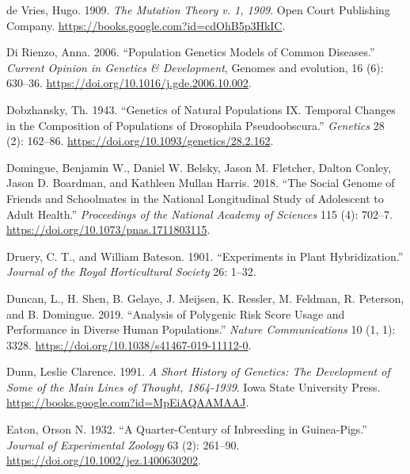 \documentclass[
]{book}
\newlength{\cslhangindent}
\newlength{\cslentryspacingunit} %
\newenvironment{CSLReferences}[2] %
 {%
  \setlength{\parindent}{0pt}
  \ifodd #1
  \let\oldpar\par
  \def\par{\hangindent=\cslhangindent\oldpar}
  \fi
  \setlength{\parskip}{#2\cslentryspacingunit}
 }%
 {}
\begin{document}
\begin{CSLReferences}{1}{0}
\leavevmode{}%
de Vries, Hugo. 1909. \emph{The {Mutation} Theory v. 1, 1909}. {Open Court Publishing Company}. \url{https://books.google.com?id=cdOhB5p3HkIC}.

\leavevmode{}%
Di Rienzo, Anna. 2006. {``Population Genetics Models of Common Diseases.''} \emph{Current Opinion in Genetics \& Development}, Genomes and evolution, 16 (6): 630--36. \url{https://doi.org/10.1016/j.gde.2006.10.002}.

\leavevmode{}%
Dobzhansky, Th. 1943. {``Genetics of Natural Populations {IX}. {Temporal} Changes in the Composition of Populations of Drosophila Pseudoobscura.''} \emph{Genetics} 28 (2): 162--86. \url{https://doi.org/10.1093/genetics/28.2.162}.

\leavevmode{}%
Domingue, Benjamin W., Daniel W. Belsky, Jason M. Fletcher, Dalton Conley, Jason D. Boardman, and Kathleen Mullan Harris. 2018. {``The Social Genome of Friends and Schoolmates in the {National Longitudinal Study} of {Adolescent} to {Adult Health}.''} \emph{Proceedings of the National Academy of Sciences} 115 (4): 702--7. \url{https://doi.org/10.1073/pnas.1711803115}.

\leavevmode{}%
Druery, C. T., and William Bateson. 1901. {``Experiments in Plant Hybridization.''} \emph{Journal of the Royal Horticultural Society} 26: 1--32.

\leavevmode{}%
Duncan, L., H. Shen, B. Gelaye, J. Meijsen, K. Ressler, M. Feldman, R. Peterson, and B. Domingue. 2019. {``Analysis of Polygenic Risk Score Usage and Performance in Diverse Human Populations.''} \emph{Nature Communications} 10 (1, 1): 3328. \url{https://doi.org/10.1038/s41467-019-11112-0}.

\leavevmode{}%
Dunn, Leslie Clarence. 1991. \emph{A {Short History} of {Genetics}: {The Development} of {Some} of the {Main Lines} of {Thought}, 1864-1939}. {Iowa State University Press}. \url{https://books.google.com?id=MpEiAQAAMAAJ}.

\leavevmode{}%
Eaton, Orson N. 1932. {``A Quarter-Century of Inbreeding in Guinea-Pigs.''} \emph{Journal of Experimental Zoology} 63 (2): 261--90. \url{https://doi.org/10.1002/jez.1400630202}.


\end{CSLReferences}
\end{document}
